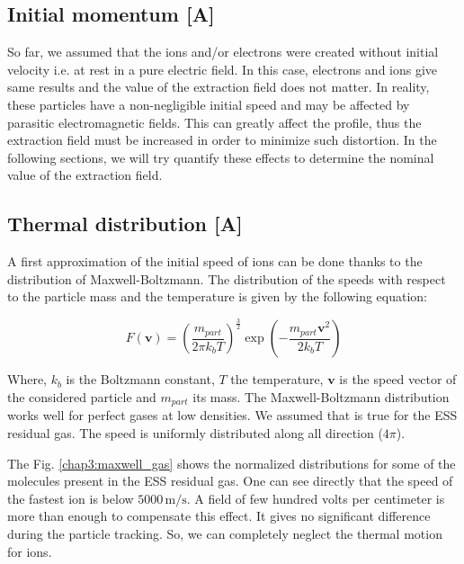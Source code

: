 \begin{refsection}
  \section{Initial momentum [A]}
  So far, we assumed that the ions and/or electrons were created without initial velocity i.e. at rest in a pure electric field. In this case, electrons and ions give same results and the value of the extraction field does not matter. In reality, these particles have a non-negligible initial speed and may be affected by parasitic electromagnetic fields. This can greatly affect the profile, thus the extraction field must be increased in order to minimize such distortion. In the following sections, we will try quantify these effects to determine the nominal value of the extraction field.

  \subsection{Thermal distribution [A]}
  A first approximation of the initial speed of ions can be done thanks to the distribution of Maxwell-Boltzmann. The distribution of the speeds with respect to the particle mass and the temperature is given by the following equation:

  \begin{equation}
    F(\boldsymbol{v}) = \left(\frac{m_{part}}{2 \pi k_{b} T}\right)^{\frac{3}{2}}\exp\left(-\frac{m_{part}\boldsymbol{v}^{2}}{2 k_{b} T}\right)
  \end{equation}
  
  Where, $k_{b}$ is the Boltzmann constant, $T$ the temperature, $\boldsymbol{v}$ is the speed vector of the considered particle and $m_{part}$ its mass. The Maxwell-Boltzmann distribution works well for perfect gases at low densities. We assumed that is true for the ESS residual gas. The speed is uniformly distributed along all direction ($4\pi$).

  The Fig. \ref{chap3:maxwell_gas} shows the normalized distributions for some of the molecules present in the ESS residual gas. One can see directly that the speed of the fastest ion is below $5000\,\mathrm{m/s}$. A field of few hundred volts per centimeter is more than enough to compensate this effect. It gives no significant difference during the particle tracking. So, we can completely neglect the thermal motion for ions.


\end{refsection}
